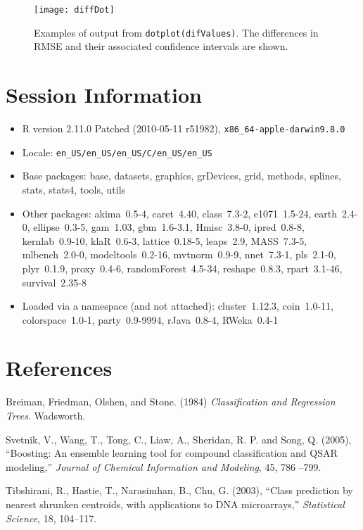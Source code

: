 \documentclass[12pt]{article}
\begin{document}
\begin{figure}
   \begin{center}		
      \texttt{[image: diffDot]}    

      \caption{ Examples of output from
        \texttt{dotplot(difValues)}. The differences in RMSE and their
        associated confidence intervals are shown.}
      \label{F:diffDot} 
    \end{center}
\end{figure} 


\section{Session Information}

\begin{itemize}\raggedright
  \item R version 2.11.0 Patched (2010-05-11 r51982), \verb|x86_64-apple-darwin9.8.0|
  \item Locale: \verb|en_US/en_US/en_US/C/en_US/en_US|
  \item Base packages: base, datasets, graphics, grDevices, grid,
    methods, splines, stats, stats4, tools, utils
  \item Other packages: akima~0.5-4, caret~4.40, class~7.3-2,
    e1071~1.5-24, earth~2.4-0, ellipse~0.3-5, gam~1.03, gbm~1.6-3.1,
    Hmisc~3.8-0, ipred~0.8-8, kernlab~0.9-10, klaR~0.6-3,
    lattice~0.18-5, leaps~2.9, MASS~7.3-5, mlbench~2.0-0,
    modeltools~0.2-16, mvtnorm~0.9-9, nnet~7.3-1, pls~2.1-0,
    plyr~0.1.9, proxy~0.4-6, randomForest~4.5-34, reshape~0.8.3,
    rpart~3.1-46, survival~2.35-8
  \item Loaded via a namespace (and not attached): cluster~1.12.3,
    coin~1.0-11, colorspace~1.0-1, party~0.9-9994, rJava~0.8-4,
    RWeka~0.4-1
\end{itemize}

\section{References}

\begin{description}

   
   \item Breiman, Friedman, Olshen, and Stone. (1984) {\it Classification and Regression Trees}. Wadsworth.


   \item Svetnik, V., Wang, T., Tong, C., Liaw, A., Sheridan, R. P. and Song, Q. (2005), ``Boosting: An ensemble learning tool for compound classification and QSAR modeling,'' {\it Journal of Chemical Information and Modeling}, 45, 786 --799.
   
   \item Tibshirani, R., Hastie, T., Narasimhan, B., Chu, G. (2003), ``Class prediction by nearest shrunken centroids, with applications to DNA microarrays,'' {\it  Statistical Science}, 18, 104--117.


\end{description}
\end{document}
